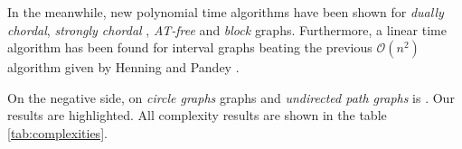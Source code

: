 In the meanwhile, new polynomial time algorithms have been shown for \textit{dually chordal}, \textit{strongly chordal} \cite{Tripathi2021}, \textit{AT-free} \cite{Kloks2021} and \textit{block} \cite{Henning2022} graphs.
Furthermore, a linear time algorithm has been found for interval graphs \cite{Pradhan2021} beating the previous $\mathcal{O}(n^2)$ algorithm given by Henning and Pandey \cite{Henning2019}.

On the negative side, \sdom on \textit{circle graphs} graphs and \textit{undirected path graphs} is \NPc. 
Our results are highlighted. All complexity results are shown in the table \cref{tab:complexities}.


\begin{center}
    \begin{table}[ht]
    \caption{\textit{Comparison between the complexities of \dom, \sdom and \tdom in the classical and parameterized setting. Open problems are marked with an ``?''.}}
\end{table}
\end{center}
